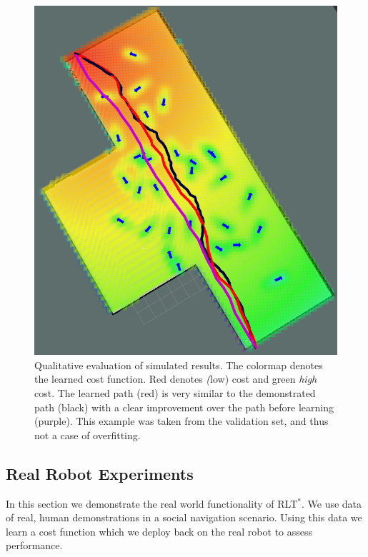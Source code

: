 \documentclass{article}  %
\begin{document}
	\begin{figure}[tbh]
	\centering
    \includegraphics[scale=0.15]{images/cf_w_plans.png}
    \caption{Qualitative evaluation of simulated results. The colormap denotes the learned cost function. Red denotes \emph(low) cost and green \emph{high} cost. The learned path (red) is very similar to the demonstrated path (black) with a clear improvement over the path before learning (purple). This example was taken from the validation set, and thus not a case of overfitting. }
    \vspace{-2mm}
  \label{fig:results_qual}
  \end{figure}


	\subsection{Real Robot Experiments}
	In this section we demonstrate the real world functionality of RLT$^*$. We use data of real, human demonstrations in a social navigation scenario. Using this data we learn a cost function which we deploy back on the real robot to assess performance. 
\end{document}
